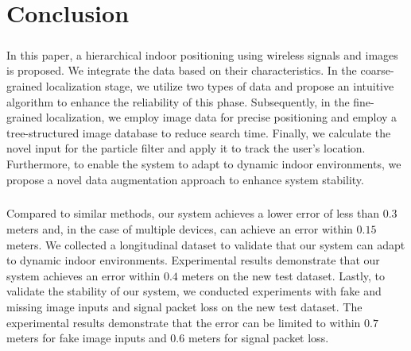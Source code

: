 \documentclass[a4paper,12pt]{report}
\begin{document}
\chapter{Conclusion}
\paragraph{}
In this paper, a hierarchical indoor positioning using wireless signals and images is proposed. We integrate the data based on their characteristics. In the coarse-grained localization stage, we utilize two types of data and propose an intuitive algorithm to enhance the reliability of this phase. Subsequently, in the fine-grained localization, we employ image data for precise positioning and employ a tree-structured image database to reduce search time. Finally, we calculate the novel input for the particle filter and apply it to track the user's location. Furthermore, to enable the system to adapt to dynamic indoor environments, we propose a novel data augmentation approach to enhance system stability.
\paragraph{}
Compared to similar methods, our system achieves a lower error of less than $0.3$ meters and, in the case of multiple devices, can achieve an error within $0.15$ meters. We collected a longitudinal dataset to validate that our system can adapt to dynamic indoor environments. Experimental results demonstrate that our system achieves an error within $0.4$ meters on the new test dataset. Lastly, to validate the stability of our system, we conducted experiments with fake and missing image inputs and signal packet loss on the new test dataset. The experimental results demonstrate that the error can be limited to within $0.7$ meters for fake image inputs and $0.6$ meters for signal packet loss.

\clearpage
{}


\end{document}
